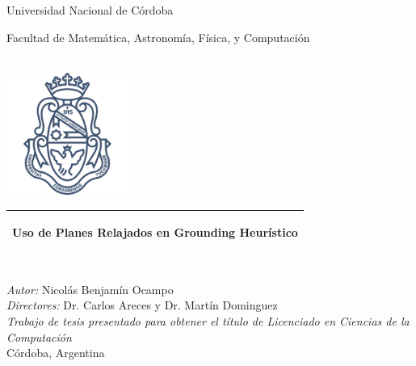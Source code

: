     
\frontmatter

\begin{titlepage}      
    \begin{center}
        {\huge
            Universidad Nacional de Córdoba
            
            \vspace{0.5cm}
            
            Facultad de Matemática, Astronomía, Física, y Computación
        }\\[1cm]
        \includegraphics[width=0.30\textwidth]{./figures/logo_unc.png}
        
        \vspace*{0.7cm}
        
        \begin{tabular}{@{}p{\textwidth}@{}}
        \toprule[2pt]
        \midrule
        \vspace{0.2cm}
        \begin{center}
        \Huge{\textbf{Uso de Planes Relajados en Grounding Heurístico}}
        \end{center}
        \vspace{0.2cm}\\
        \midrule
        \toprule[2pt]
        \end{tabular}

        \linespread{1}~\\[0.7cm]

        {\Large
            \emph{Autor:} Nicolás Benjamín Ocampo
        }\\[1cm]
        {\Large
            \emph{Directores:} Dr. Carlos Areces y Dr. Martín Dominguez
        }\\[1cm]
        
        \Large \emph{Trabajo de tesis presentado para obtener el título de
        Licenciado en Ciencias de la Computación}\\[0.3cm] 
        
        Córdoba, Argentina \hfill \frontpagetoday

        \doclicenseThis
    \end{center}
\end{titlepage}